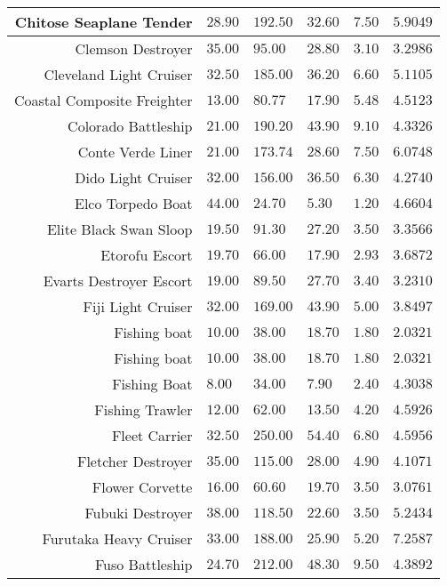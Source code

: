 \begin{tabularx}{\textwidth}{|r|l|l|l|l|X|}
\hline
Chitose Seaplane Tender & $28.90$ & $192.50$ & $32.60$ & $7.50$ & $5.9049$ \\
\hline
Clemson Destroyer & $35.00$ & $95.00$ & $28.80$ & $3.10$ & $3.2986$ \\
\hline
Cleveland Light Cruiser & $32.50$ & $185.00$ & $36.20$ & $6.60$ & $5.1105$ \\
\hline
Coastal Composite Freighter & $13.00$ & $80.77$ & $17.90$ & $5.48$ & $4.5123$ \\
\hline
Colorado Battleship & $21.00$ & $190.20$ & $43.90$ & $9.10$ & $4.3326$ \\
\hline
Conte Verde Liner & $21.00$ & $173.74$ & $28.60$ & $7.50$ & $6.0748$ \\
\hline
Dido Light Cruiser & $32.00$ & $156.00$ & $36.50$ & $6.30$ & $4.2740$ \\
\hline
Elco Torpedo Boat & $44.00$ & $24.70$ & $5.30$ & $1.20$ & $4.6604$ \\
\hline
Elite Black Swan Sloop & $19.50$ & $91.30$ & $27.20$ & $3.50$ & $3.3566$ \\
\hline
Etorofu Escort & $19.70$ & $66.00$ & $17.90$ & $2.93$ & $3.6872$ \\
\hline
Evarts Destroyer Escort & $19.00$ & $89.50$ & $27.70$ & $3.40$ & $3.2310$ \\
\hline
Fiji Light Cruiser & $32.00$ & $169.00$ & $43.90$ & $5.00$ & $3.8497$ \\
\hline
Fishing boat & $10.00$ & $38.00$ & $18.70$ & $1.80$ & $2.0321$ \\
\hline
Fishing boat & $10.00$ & $38.00$ & $18.70$ & $1.80$ & $2.0321$ \\
\hline
Fishing Boat & $8.00$ & $34.00$ & $7.90$ & $2.40$ & $4.3038$ \\
\hline
Fishing Trawler & $12.00$ & $62.00$ & $13.50$ & $4.20$ & $4.5926$ \\
\hline
Fleet Carrier & $32.50$ & $250.00$ & $54.40$ & $6.80$ & $4.5956$ \\
\hline
Fletcher Destroyer & $35.00$ & $115.00$ & $28.00$ & $4.90$ & $4.1071$ \\
\hline
Flower Corvette & $16.00$ & $60.60$ & $19.70$ & $3.50$ & $3.0761$ \\
\hline
Fubuki Destroyer & $38.00$ & $118.50$ & $22.60$ & $3.50$ & $5.2434$ \\
\hline
Furutaka Heavy Cruiser & $33.00$ & $188.00$ & $25.90$ & $5.20$ & $7.2587$ \\
\hline
Fuso Battleship & $24.70$ & $212.00$ & $48.30$ & $9.50$ & $4.3892$ \\

\end{tabularx}
